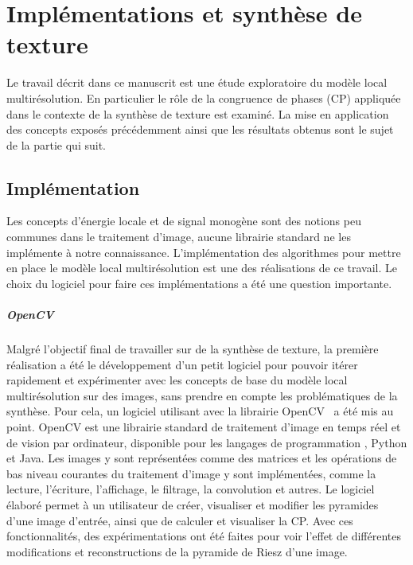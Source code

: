 \chapter{Implémentations et synthèse de texture}
\label{chap:chapitre2}

Le travail décrit dans ce manuscrit est une étude exploratoire du modèle local multirésolution. En particulier le rôle de la congruence de phases (CP) appliquée dans le contexte de la synthèse de texture est examiné. La mise en application des concepts exposés précédemment ainsi que les résultats obtenus sont le sujet de la partie qui suit.

\section{Implémentation}

Les concepts d'énergie locale et de signal monogène sont des notions peu communes dans le traitement d'image, aucune librairie standard ne les implémente à notre connaissance. L'implémentation des algorithmes pour mettre en place le modèle local multirésolution est une des réalisations de ce travail. Le choix du logiciel pour faire ces implémentations a été une question importante.


\paragraph{OpenCV}

Malgré l'objectif final de travailler sur de la synthèse de texture, la première réalisation a été le développement d'un petit logiciel pour pouvoir itérer rapidement et expérimenter avec les concepts de base du modèle local multirésolution sur des images, sans prendre en compte les problématiques de la synthèse. Pour cela, un logiciel utilisant \cpp avec la librairie OpenCV~\cite{opencv_library} a été mis au point. OpenCV est une librairie standard de traitement d'image en temps réel et de vision par ordinateur, disponible pour les langages de programmation \cpp, Python et Java. Les images y sont représentées comme des matrices et les opérations de bas niveau courantes du traitement d'image y sont implémentées, comme la lecture, l'écriture, l'affichage, le filtrage, la convolution et autres. Le logiciel élaboré permet à un utilisateur de créer, visualiser et modifier les pyramides d'une image d'entrée, ainsi que de calculer et visualiser la CP. Avec ces fonctionnalités, des expérimentations ont été faites pour voir l'effet de différentes modifications et reconstructions de la pyramide de Riesz d'une image.

